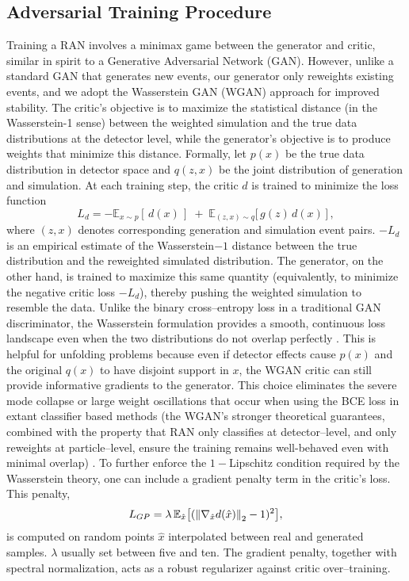 {{    \subsection{Adversarial Training Procedure}
        Training a RAN involves a minimax game between the generator and critic, similar in spirit to a Generative Adversarial Network (GAN).
        However, unlike a standard GAN that generates new events, our generator only reweights existing events, and we adopt the Wasserstein GAN (WGAN) approach  for improved stability.
        The critic’s objective is to maximize the statistical distance (in the Wasserstein-1 sense) between the weighted simulation and the true data distributions at the detector level, while the generator’s objective is to produce weights that minimize this distance.
        Formally, let $p(x)$ be the true data distribution in detector space and $q(z, x)$ be the joint distribution of generation and simulation.
        At each training step, the critic $d$ is trained to minimize the loss function
        \[
            L_d = -\mathbb{E}_{x\sim p}[\,d(x)\,]\;+\;\mathbb{E}_{(z, x)\sim q}\big[\,g(z)\,d(x)\,\big]\,,
            \label{eq:wgan_loss}
        \]
        where $(z, x)$ denotes corresponding generation and simulation event pairs.
        $-L_d$ is an empirical estimate of the Wasserstein\(-1\) distance between the true distribution and the reweighted simulated distribution.
        The generator, on the other hand, is trained to maximize this same quantity (equivalently, to minimize the negative critic loss $-L_d$), thereby pushing the weighted simulation to resemble the data.
        Unlike the binary cross--entropy loss in a traditional GAN discriminator, the Wasserstein formulation provides a smooth, continuous loss landscape even when the two distributions do not overlap perfectly .
        This is helpful for unfolding problems because even if detector effects cause $p(x)$ and the original $q(x)$ to have disjoint support in $x$, the WGAN critic can still provide informative gradients to the generator.
        This choice eliminates the severe mode collapse or large weight oscillations that occur when using the BCE loss in extant classifier based methods (the WGAN’s stronger theoretical guarantees, combined with the property that RAN only classifies at detector--level, and only reweights at particle--level, ensure the training remains well-behaved even with minimal overlap) .
        To further enforce the \(1-\)Lipschitz condition required by the Wasserstein theory, one can include a gradient penalty term  in the critic’s loss.
        This penalty,
        \[
            L_{GP} = \lambda\,\mathbb{E}_{\hat{x}}\qty[(\norm{\nabla_{\hat{x}}d(\hat{x})}_2 - 1)^2],
        \]
        is computed on random points $\hat{x}$ interpolated between real and generated samples.
        $\lambda$ usually set between five and ten.
        The gradient penalty, together with spectral normalization, acts as a robust regularizer against critic over--training.

}}
